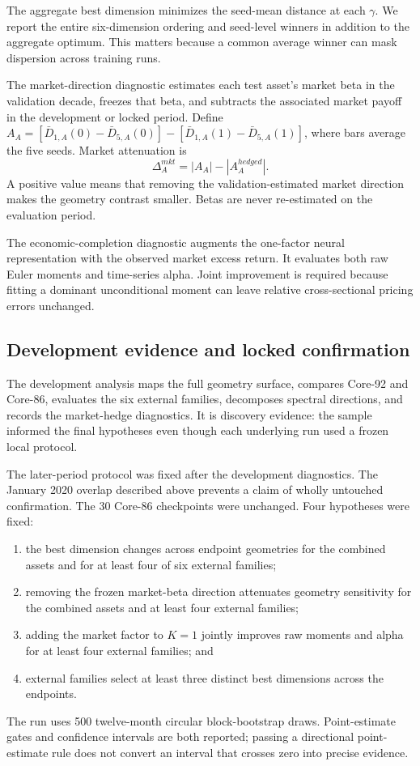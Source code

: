 The aggregate best dimension minimizes the seed-mean distance at each $\gamma$. We report the entire six-dimension ordering and seed-level winners in addition to the aggregate optimum. This matters because a common average winner can mask dispersion across training runs.

The market-direction diagnostic estimates each test asset's market beta in the validation decade, freezes that beta, and subtracts the associated market payoff in the development or locked period. Define $A_A=[\bar D_{1,A}(0)-\bar D_{5,A}(0)]-[\bar D_{1,A}(1)-\bar D_{5,A}(1)]$, where bars average the five seeds. Market attenuation is
\begin{equation}
 \Delta_A^{mkt}=|A_A|-|A_A^{hedged}|.
\end{equation}
A positive value means that removing the validation-estimated market direction makes the geometry contrast smaller. Betas are never re-estimated on the evaluation period.

The economic-completion diagnostic augments the one-factor neural representation with the observed market excess return. It evaluates both raw Euler moments and time-series alpha. Joint improvement is required because fitting a dominant unconditional moment can leave relative cross-sectional pricing errors unchanged.

\subsection{Development evidence and locked confirmation}

The development analysis maps the full geometry surface, compares Core-92 and Core-86, evaluates the six external families, decomposes spectral directions, and records the market-hedge diagnostics. It is discovery evidence: the sample informed the final hypotheses even though each underlying run used a frozen local protocol.

The later-period protocol was fixed after the development diagnostics. The January 2020 overlap described above prevents a claim of wholly untouched confirmation. The 30 Core-86 checkpoints were unchanged. Four hypotheses were fixed:
\begin{enumerate}
 \item the best dimension changes across endpoint geometries for the combined assets and for at least four of six external families;
 \item removing the frozen market-beta direction attenuates geometry sensitivity for the combined assets and at least four external families;
 \item adding the market factor to $K=1$ jointly improves raw moments and alpha for at least four external families; and
 \item external families select at least three distinct best dimensions across the endpoints.
\end{enumerate}
The run uses 500 twelve-month circular block-bootstrap draws. Point-estimate gates and confidence intervals are both reported; passing a directional point-estimate rule does not convert an interval that crosses zero into precise evidence.

